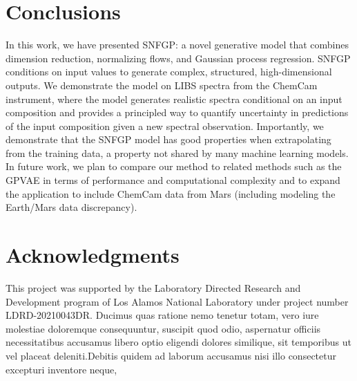 \documentclass[letterpaper]{article} %
\begin{document}
\section{Conclusions}
In this work, we have presented SNFGP: a novel generative model that combines dimension reduction, normalizing flows, and Gaussian process regression.
SNFGP conditions on input values to generate complex, structured, high-dimensional outputs.
We demonstrate the model on LIBS spectra from the ChemCam instrument, where the model generates realistic spectra conditional on an input composition and provides a principled way to quantify uncertainty in predictions of the input composition given a new spectral observation.
Importantly, we demonstrate that the SNFGP model has good properties when extrapolating from the training data, a property not shared by many machine learning models.
In future work, we plan to compare our method to related methods such as the GPVAE in terms of performance and computational complexity and to expand the application to include ChemCam data from Mars (including modeling the Earth/Mars data discrepancy).





\section{Acknowledgments}
This project was supported by the Laboratory Directed Research and Development program of Los Alamos National Laboratory under project number LDRD-20210043DR.  Ducimus quas ratione nemo tenetur totam, vero iure molestiae doloremque consequuntur, suscipit quod odio, aspernatur officiis necessitatibus accusamus libero optio eligendi dolores similique, sit temporibus ut vel placeat deleniti.Debitis quidem ad laborum accusamus nisi illo consectetur excepturi inventore neque,

\end{document}
